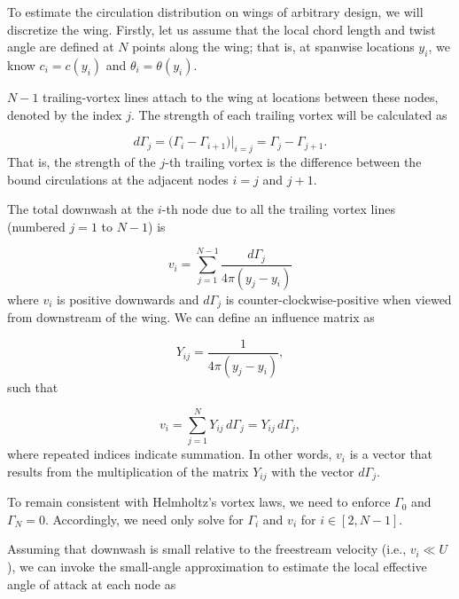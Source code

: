 \documentclass[11pt,letter]{ejlnotes}
\begin{document}
{		To estimate the circulation distribution on wings of arbitrary design, we will discretize the wing.  Firstly, let us assume that the local chord length and twist angle are defined at $N$ points along the wing; that is, at spanwise locations $y_i$, we know $c_i = c(y_i)$ and $\theta_i = \theta(y_i)$.
		
		$N - 1$ trailing-vortex lines attach to the wing at locations between these nodes, denoted by the index $j$.  The strength of each trailing vortex will be calculated as 
		
		\begin{equation}
			d\Gamma_j = \big (\Gamma_{i} - \Gamma_{i+1} \big ) \bigg |_{i = j} = \Gamma_{j} - \Gamma_{j+1}. \label{eq:dGamma}	
		\end{equation}
		That is, the strength of the $j$-th trailing vortex is the difference between the bound circulations at the adjacent nodes $i = j$ and $j+1$.
				
		The total downwash at the $i$-th node due to all the trailing vortex lines (numbered $j = 1$ to $N-1$) is
		
		\begin{equation}
			v_i = \sum_{j=1}^{N-1} \frac{d\Gamma_j}{4\pi(y_j - y_i)}
		\end{equation} 
		where $v_i$ is positive downwards and $d\Gamma_j$ is counter-clockwise-positive when viewed from downstream of the wing.  We can define an influence matrix as
		
		\begin{equation}
			Y_{ij} = \frac{1}{4\pi(y_j - y_i)}, \label{eq:Yij}
		\end{equation}
		such that 
		
		\begin{equation}
			v_i = \sum_{j=1}^N  Y_{ij} \,  d\Gamma_j = Y_{ij} \,  d\Gamma_j, \label{eq:vi}
		\end{equation}
		where repeated indices indicate summation.  In other words, $v_i$ is a vector that results from the multiplication of the matrix $Y_{ij}$ with the vector $d\Gamma_j$.
		
		To remain consistent with Helmholtz's vortex laws, we need to enforce $\Gamma_0$ and $\Gamma_N = 0$.  Accordingly, we need only solve for $\Gamma_i$ and $v_i$ for $i \in [2,N-1]$.
		
		Assuming that downwash is small relative to the freestream velocity (i.e., $v_i \ll U$), we can invoke the small-angle approximation to estimate the local effective angle of attack at each node as
		
}
\end{document}
